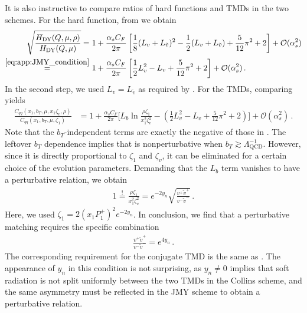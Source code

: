 \documentclass[11pt,a4paper]{article}
\newcommand{\cO}{\mathcal{O}}
\newcommand{\nn}{\nonumber}
\newcommand{\as}{\alpha_s}
\newcommand{\LQCD}{\Lambda_\mathrm{QCD}}
\newcommand{\tv}{{\tilde v}}
\newcommand{\DY}{\mathrm{DY}}
\begin{document}
It is also instructive to compare ratios of hard functions and TMDs in the two schemes.
For the hard function, from  we obtain
\begin{align} \label{eq:app:ratio_hard}
 \sqrt{\frac{H_\DY(Q, \mu, \rho)}{H_\DY(Q, \mu)}}
 =&~ 1 + \frac{\as C_F}{2\pi} \left[ \frac18 (L_v + L_\tv)^2 - \frac12(L_v + L_\tv) + \frac{5}{12} \pi^2 + 2 \right]
   + \cO(\as^2)
 \nn\\
 \stackrel{\eqref{eq:app:JMY_condition}}{=} &~1 + \frac{\as C_F}{2\pi} \left[ \frac12 L_v^2 - L_v  + \frac{5}{12} \pi^2 + 2 \right]
   + \cO(\as^2)
\,.\end{align}
In the second step, we used $L_v = L_\tv$ as required by .
For the TMDs, comparing  yields
\begin{align} \label{eq:app:ratio_TMDs}
 \frac{C_{qq}(x_1, b_T, \mu, x_1 \zeta_v, \rho)}{C_{qq}(x_1, b_T, \mu, \zeta_1)} &
 = 1 + \frac{\as C_F}{2\pi} \biggl[ L_b \ln\frac{\rho \zeta_1}{x_1^2 \zeta_v^2} - \left( \frac12  L_v^2 - L_v + \frac{5}{12} \pi^2  + 2 \right) \biggr]
   + \cO(\as^2)
\,.\end{align}
Note that the $b_T$-independent terms are exactly the negative of those in .
The leftover $b_T$ dependence implies that  is nonperturbative when $b_T \gtrsim \LQCD^{-1}$.
However, since it is directly proportional to $\zeta_1$ and $\zeta_v$,
it can be eliminated for a certain choice of the evolution parameters.
Demanding that the $L_b$ term vanishes to have a perturbative relation, we obtain
\begin{align} \label{eq:app:JMY_pert_matching_1}
 1 \stackrel{!}{=} \frac{\rho \zeta_1}{x_1^2 \zeta_v^2}
 =  e^{-2 y_n} \sqrt{\frac{v^+ \tv^+}{v^- \tv^-}}
\,.\end{align}
Here, we used $\zeta_1 = 2 (x_1 P_1^+)^2 e^{-2 y_n}$.
In conclusion, we find that a perturbative matching requires the specific combination
\begin{align} \label{eq:app:JMY_pert_matching_2}
 \frac{v^+ \tv^+}{v^- \tv^-} = e^{4 y_n}
\,.\end{align}
The corresponding requirement for the conjugate TMD is the same as .
The appearance of $y_n$ in this condition is not surprising,
as $y_n \ne 0$ implies that soft radiation is not split uniformly between the two
TMDs in the Collins scheme, and the same asymmetry must be reflected in the JMY scheme
to obtain a perturbative relation.
\end{document}

